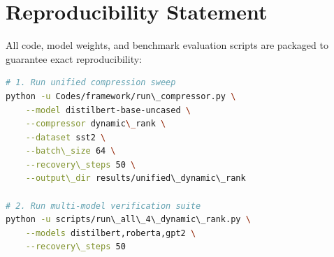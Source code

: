 \section{Reproducibility Statement}
All code, model weights, and benchmark evaluation scripts are packaged to guarantee exact reproducibility:
\begin{lstlisting}[language=bash]
# 1. Run unified compression sweep
python -u Codes/framework/run\_compressor.py \
    --model distilbert-base-uncased \
    --compressor dynamic\_rank \
    --dataset sst2 \
    --batch\_size 64 \
    --recovery\_steps 50 \
    --output\_dir results/unified\_dynamic\_rank

# 2. Run multi-model verification suite
python -u scripts/run\_all\_4\_dynamic\_rank.py \
    --models distilbert,roberta,gpt2 \
    --recovery\_steps 50
\end{lstlisting}
